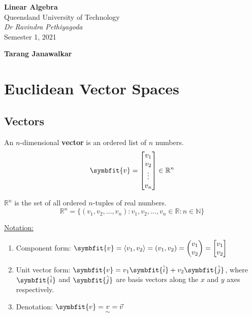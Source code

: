 \documentclass{article}
\author{\textbf{\authorName}}
\date{}
\newcommand{\uniTitle}{Queensland University of Technology}
\newcommand{\className}{Linear Algebra}
\newcommand{\classTime}{Semester 1, 2021}
\newcommand{\classInstructorName}{Dr Ravindra Pethiyagoda}
\newcommand{\authorName}{Tarang Janawalkar}
\begin{document}
\begin{titlepage}
    \vspace*{\fill}
	\begin{center}
        \LARGE
        \textbf{\className}
        \texorpdfstring{\\}{ }
        \uniTitle
        \texorpdfstring{\\}{ }
        \texorpdfstring{\vspace{0.3in}}{ }
        \normalsize\textit{\classInstructorName}
        \texorpdfstring{\\}{ }
        \classTime
    \end{center}
    \begin{center}
        \textbf{\authorName}
    \end{center}
    \vspace*{\fill}
    \doclicenseThis
    \thispagestyle{empty}
\end{titlepage}
\newpage

\tableofcontents 
\newpage
\section{Euclidean Vector Spaces}
	\subsection{Vectors}
	\begin{definition}
		An $n$-dimensional \textbf{vector} is an ordered list of $n$ numbers.
		\begin{equation*}
			\symbfit{v} = \mqty[v_1 \\ v_2 \\ \vdots \\ v_n] \in \mathbb{R}^n
		\end{equation*}
	\end{definition}
	\begin{theorem}
		$\mathbb{R}^n$ is the set of all ordered $n$-tuples of real numbers.
		\begin{equation*}
			\mathbb{R}^n = \bigl\{\left(v_1, v_2, \ldots, v_n\right): v_1, v_2, \ldots, v_n \in \mathbb{R}: n \in \mathbb{N}\bigr\}
		\end{equation*}
	\end{theorem}
	\underline{Notation:}

	\begin{enumerate}
		\item Component form: $\symbfit{v} = \left\langle{v_1,v_2}\right\rangle = \left(v_1,v_2\right) = \mqty(v_1 \\ v_2) = \mqty[v_1 \\ v_2]$
		\item Unit vector form: $\symbfit{v} = v_1\symbfit{\hat{i}} + v_2\symbfit{\hat{j}}$, where $\symbfit{\hat{i}}$ and $\symbfit{\hat{j}}$ are basis vectors along the $x$ and $y$ axes respectively.
		\item Denotation: $\symbfit{v} = \underset{\sim}{v} = \vec{v}$
	\end{enumerate}
\end{document}
